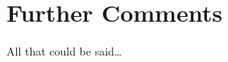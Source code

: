 \chapter{Further Comments}\hypertarget{further-comments}{}\label{further-comments}

All that could be said\ldots{}

